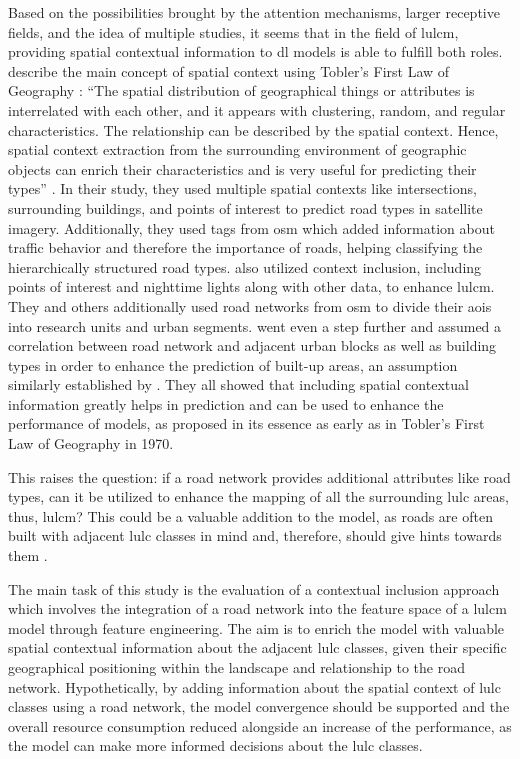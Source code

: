 Based on the possibilities brought by the attention mechanisms, larger receptive fields, and the idea of multiple studies, it seems that in the field of \gls{lulcm}, providing spatial contextual information to \gls{dl} models is able to fulfill both roles. \textcite{Zhao.Ning.ea2023} describe the main concept of spatial context using Tobler's First Law of Geography \autocite{Tobler1970}: \enquote{The spatial distribution of geographical things or attributes is interrelated with each other, and it appears with clustering, random, and regular characteristics. The relationship can be described by the spatial context. Hence, spatial context extraction from the surrounding environment of geographic objects can enrich their characteristics and is very useful for predicting their types} \autocite[2]{Zhao.Ning.ea2023}. In their study, they used multiple spatial contexts like intersections, surrounding buildings, and points of interest to predict road types in satellite imagery. Additionally, they used tags from \gls{osm} which added information about traffic behavior and therefore the importance of roads, helping classifying the hierarchically structured road types. \textcite{Xu.Zhou.ea2022,Zong.He.ea2020} also utilized context inclusion, including points of interest and nighttime lights along with other data, to enhance \gls{lulcm}. They and others additionally used road networks from \gls{osm} to divide their \glspl{aoi} into research units and urban segments. \textcite{Forget.Linard.ea2018} went even a step further and assumed a correlation between road network and adjacent urban blocks as well as building types in order to enhance the prediction of built-up areas, an assumption similarly established by \textcite{Ahmadzai2020}. They all showed that including spatial contextual information greatly helps in prediction and can be used to enhance the performance of models, as proposed in its essence as early as in Tobler's First Law of Geography in 1970.

This raises the question: if a road network provides additional attributes like road types, can it be utilized to enhance the mapping of all the surrounding \gls{lulc} areas, thus, \gls{lulcm}? This could be a valuable addition to the model, as roads are often built with adjacent \gls{lulc} classes in mind and, therefore, should give hints towards them \autocite{Ahmadzai2020,Levinson.Xie.ea2007,Zeng.Zhao.ea2020}. 

The main task of this study is the evaluation of a contextual inclusion approach which involves the integration of a road network into the feature space of a \gls{lulcm} model through feature engineering. The aim is to enrich the model with valuable spatial contextual information about the adjacent \gls{lulc} classes, given their specific geographical positioning within the landscape and relationship to the road network. Hypothetically, by adding information about the spatial context of \gls{lulc} classes using a road network, the model convergence should be supported and the overall resource consumption reduced alongside an increase of the performance, as the model can make more informed decisions about the \gls{lulc} classes.

